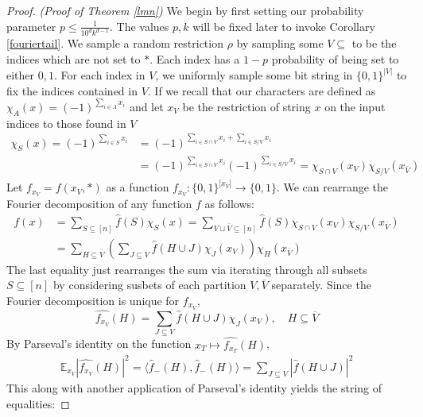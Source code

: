 \documentclass{amsart}
\theoremstyle{definition}
\theoremstyle{remark}
\numberwithin{equation}{section}
\theoremstyle{remark}
\begin{document}
\begin{proof}{\emph{(Proof of Theorem \ref{lmn})}}
We begin by first setting our probability parameter $p \leq \frac{1}{10^dk^{d-1}}$. The values $p, k$ will be fixed later to invoke Corollary \ref{fouriertail}.
We sample a random restriction $\rho$ by sampling some $V \subseteq$ to be the indices which are not set to $*$. Each index has a $1-p$ probability of being set to either $0,1$. For each index in $V$, we uniformly sample some bit string in $\{0,1\}^{|V|}$ to fix the indices contained in $V$. If we recall that our characters are defined as $\chi_A(x) = (-1)^{\sum_{i \in A} x_i}$ and let $x_{V}$ be the restriction of string $x$ on the input indices to those found in $V$ \newline
%
\begin{align}
  \chi_S(x) = (-1)^{\sum_{i \in S} x_i}
  & = (-1)^{\sum_{i \in S \cap V} x_i + \sum_{i \in S / V} x_i}   \\
  & = (-1)^{\sum_{i \in S \cap V} x_i}(-1)^{\sum_{i \in S / V} x_i} = \chi_{S \cap V}(x_V) \chi_{S / V}(x_{\overline{V}})
\end{align}
%
Let $f_{x_V} = f(x_V,*)$ as a function $f_{x_V}: \{0,1\}^{|x_{\overline{V}}|} \rightarrow \{0,1\}$.
We can rearrange the Fourier decomposition of any function $f$ as follows:
%
\begin{align}
f(x)
& = \sum_{S \subseteq [n]} \hat{f}(S)\chi_{S}(x) =  \sum_{V \sqcup \overline{V} \subseteq [n]} \hat{f}(S)\chi_{S \cap V}(x_V)\chi_{S / V}({x_{\overline{V}}}) \\
& = \sum_{H \subseteq \overline{V}} \left( \sum_{J \subseteq V} \hat{f}(H \cup J) \chi_{J}(x_V) \right) \chi_H(x_{\overline{V}})
\end{align}
%
The last equality just rearranges the sum via iterating through all subsets $S \subseteq [n]$ by considering susbets of each partition $V, \overline{V}$ separately. Since the Fourier decomposition is unique for $f_{x_V}$,
\begin{equation}
  \widehat{f_{x_V}}(H) = \sum_{J \subseteq V} \hat{f}(H \cup J)\chi_{J}(x_V), \quad H \subseteq \overline{V}
\end{equation}
By Parseval's identity on the function $x_T \mapsto \widehat{f_{x_T}}(H)$,
\begin{align}
  \mathbb{E}_{x_V}|\widehat{f_{x_V}}(H)|^2 = \langle \hat{f}_{-}(H), \hat{f}_{-}(H) \rangle = \sum_{J \subseteq V} |\hat{f}(H \cup J)|^2
\end{align}
%
This along with another application of Parseval's identity yields the string of equalities: \newline

\end{proof}
\end{document}
